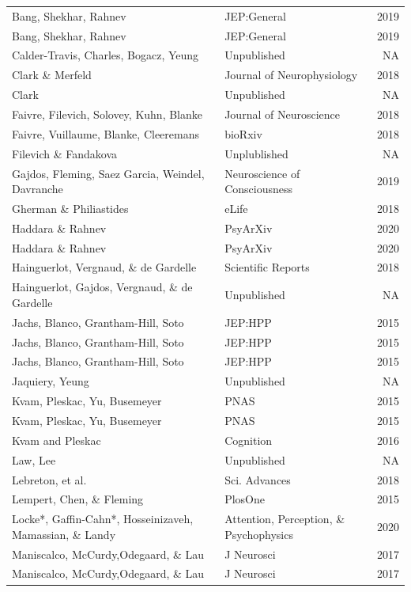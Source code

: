 \documentclass[
]{article}
\begin{document}
\begin{longtable}[t]{llr}
\endfoot
\bottomrule
\endlastfoot
Bang, Shekhar, Rahnev & JEP:General & 2019\\
Bang, Shekhar, Rahnev & JEP:General & 2019\\
Calder-Travis, Charles,  Bogacz, Yeung & Unpublished & NA\\
Clark \& Merfeld & Journal of Neurophysiology & 2018\\
Clark & Unpublished & NA\\
\addlinespace
Faivre, Filevich, Solovey, Kuhn, Blanke & Journal of Neuroscience & 2018\\
Faivre, Vuillaume, Blanke, Cleeremans & bioRxiv & 2018\\
Filevich \& Fandakova & Unplublished & NA\\
Gajdos, Fleming, Saez Garcia, Weindel, Davranche & Neuroscience of Consciousness & 2019\\
Gherman \& Philiastides & eLife & 2018\\
\addlinespace
Haddara \& Rahnev & PsyArXiv & 2020\\
Haddara \& Rahnev & PsyArXiv & 2020\\
Hainguerlot, Vergnaud, \& de Gardelle & Scientific Reports & 2018\\
Hainguerlot, Gajdos, Vergnaud, \& de Gardelle & Unpublished & NA\\
Jachs, Blanco, Grantham-Hill, Soto & JEP:HPP & 2015\\
\addlinespace
Jachs, Blanco, Grantham-Hill, Soto & JEP:HPP & 2015\\
Jachs, Blanco, Grantham-Hill, Soto & JEP:HPP & 2015\\
Jaquiery, Yeung & Unpublished & NA\\
Kvam, Pleskac, Yu, Busemeyer & PNAS & 2015\\
Kvam, Pleskac, Yu, Busemeyer & PNAS & 2015\\
\addlinespace
Kvam and Pleskac & Cognition & 2016\\
Law, Lee & Unpublished & NA\\
Lebreton, et al. & Sci. Advances & 2018\\
Lempert, Chen, \& Fleming & PlosOne & 2015\\
Locke*, Gaffin-Cahn*, Hosseinizaveh, Mamassian, \& Landy & Attention, Perception, \& Psychophysics & 2020\\
\addlinespace
Maniscalco, McCurdy,Odegaard, \& Lau & J Neurosci & 2017\\
Maniscalco, McCurdy,Odegaard, \& Lau & J Neurosci & 2017\\

\end{longtable}
\end{document}
